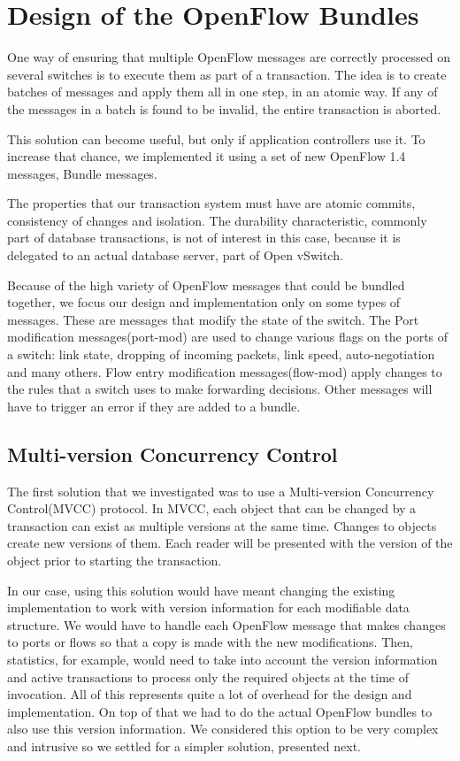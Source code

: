 \chapter{Design of the OpenFlow Bundles}
\label{chapter:architecture}  

One way of ensuring that multiple OpenFlow messages are correctly processed on several switches
is to execute them as part of a transaction. The idea is to create batches of messages and apply them
all in one step, in an atomic way. If any of the messages in a batch is found to be invalid, the entire
transaction is aborted.

This solution can become useful, but only if application controllers use it. To increase that chance, we
implemented it using a set of new OpenFlow 1.4 messages, Bundle messages.

The properties that our transaction system must have are atomic commits, consistency of changes and isolation.
The durability characteristic, commonly part of database transactions, is not of interest in this case, because
it is delegated to an actual database server, part of Open vSwitch.

Because of the high variety of OpenFlow messages that could be bundled together, we focus our design
and implementation only on some types of messages. These are messages that modify the state of the switch.
The Port modification messages(port-mod) are used to change various flags on the ports of a switch: link state,
dropping of incoming packets, link speed, auto-negotiation and many others. Flow entry modification messages(flow-mod)
apply changes to the rules that a switch uses to make forwarding decisions. Other messages will have to
trigger an error if they are added to a bundle.

\section{Multi-version Concurrency Control}

The first solution that we investigated was to use a Multi-version Concurrency Control(MVCC) protocol\cite{weikum.1}.
In MVCC, each object that can be changed by a transaction can exist as multiple versions at the same time. Changes to
objects create new versions of them. Each reader will be presented with the version of the object prior to starting
the transaction.

In our case, using this solution would have meant changing the existing implementation to work with version information
for each modifiable data structure. We would have to handle each OpenFlow message that makes changes to ports or flows
so that a copy is made with the new modifications. Then, statistics, for example, would need to take into account the
version information and active transactions to process only the required objects at the time of invocation. All of this
represents quite a lot of overhead for the design and implementation. On top of that we had to do the actual OpenFlow
bundles to also use this version information. We considered this option to be very complex and intrusive so we settled
for a simpler solution, presented next.

